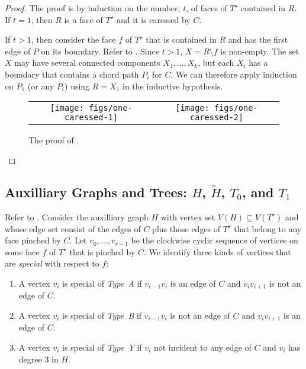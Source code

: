 \documentclass{patmorin}
\newcommand{\dual}[1]{{#1}^\star}
\begin{document}
\begin{proof}
   The proof is by
   induction on the number, $t$, of faces of $\dual{T}$ contained in $R$.
   If $t=1$, then $R$ is a face of $\dual{T}$ and it is caressed by $C$.

   If $t>1$, then consider the face $f$ of $\dual{T}$ that is contained
   in $R$ and has the first edge of $P$ on its boundary.  Refer to
   . Since $t>1$, $X=R\setminus f$ is non-empty. The
   set $X$ may have several connected components $X_1,\ldots,X_k$, but
   each $X_i$ has a boundary that contains a chord path $P_i$ for $C$.
   We can therefore apply induction on $P_1$ (or any $P_i$) using $R=X_1$
   in the inductive hypothesis.
  \begin{figure}
     \begin{center}
	\begin{tabular}{cc}
		\texttt{[image: figs/one-caressed-1]} &
		\texttt{[image: figs/one-caressed-2]}
	\end{tabular}
     \end{center}
	  \caption{The proof of .}
  \end{figure}
\end{proof}

\subsection{Auxilliary Graphs and Trees: $H$, $\tilde{H}$, $T_0$, and $T_1$}

Refer to . Consider the auxilliary
graph $H$ with vertex set $V(H)\subseteq V(\dual{T})$ and whose edge set
consist of the edges of $C$ plus those edges of $\dual{T}$ that belong
to any face pinched by $C$. Let $v_0,\ldots,v_{r-1}$ be the clockwise cyclic sequence of vertices on some face $f$ of $\dual{T}$ that is pinched by $C$.  
We identify three kinds of vertices that are \emph{special} with respect to $f$:
\begin{enumerate}
  \item A vertex $v_i$ is special of \emph{Type~A} if $v_{i-1}v_i$ is an edge of $C$ and $v_iv_{i+1}$ is not an edge of $C$.
  \item A vertex $v_i$ is special of \emph{Type~B} if $v_{i-1}v_i$ is not an edge of $C$ and $v_iv_{i+1}$ is an edge of $C$.
  \item A vertex $v_i$ is special of \emph{Type~Y} if $v_i$ not incident to any edge of $C$ and $v_i$ has degree 3 in $H$.
\end{enumerate}
\end{document}
